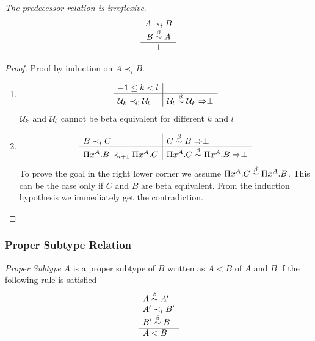 \begin{lemma}
    \label{PrecedenceIrreflexive}
    \emph{The predecessor relation is irreflexive}.
    $$\begin{array}{c} A \prec_i B \\ B \stackrel{\beta}{\sim} A \\ \hline \perp\end{array}$$

    \begin{proof}
        Proof by induction on $A \prec_i B$.

        \begin{enumerate}
        \item
        $$
            \begin{array}{l|l}
                -1 \le k < l
                \\
                \hline
                {\cal U}_k \prec_0 {\cal U}_l
                &
                {\cal U}_l \stackrel{\beta}{\sim} {\cal U}_k \Rightarrow \perp
            \end{array}
        $$
        ${\cal U}_k$ and ${\cal U}_l$ cannot be beta equivalent for different $k$ and $l$


        \item
        $$
            \begin{array}{l|l}
                B \prec_i C
                &
                C \stackrel{\beta}{\sim} B \Rightarrow \perp
                \\
                \hline
                \Pi x^A. B \prec_{i+1} \Pi x^A. C
                &
                \Pi x^A. C \stackrel{\beta}{\sim} \Pi x^A. B \Rightarrow \perp
            \end{array}
        $$
        To prove the goal in the right lower corner we assume $\Pi x^A. C
        \stackrel{\beta}{\sim} \Pi x^A.B$. This can be the case only if $C$ and $B$ are
        beta equivalent. From the induction hypothesis we immediately
        get the contradiction.
        \end{enumerate}
    \end{proof}
\end{lemma}








\subsubsection{Proper Subtype Relation}



\begin{definition}
    \emph{Proper Subtype}
    $A$ is a proper subtype of $B$ written as $A < B$
    of $A$ and $B$ if the following rule is satisfied
    $$
    \begin{array}{l} 
        A \stackrel{\beta}{\sim} A'
        \\
        A' \prec_i B'
        \\
        B' \stackrel{\beta}{\sim} B
     \\ \hline 
        A < B
    \end{array}
    $$
\end{definition}



